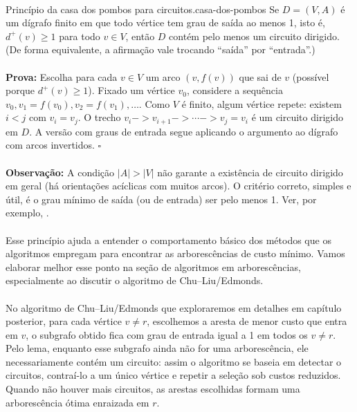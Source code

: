 \documentclass[12pt,a4paper]{article}
\def\emph#1{#1}%
\def\to{->}%
\begin{document}
\paragraph{}
\begin{lemabox}{Princípio da casa dos pombos para circuitos.}{casa-dos-pombos}
Se \(D=(V,A)\) é um dígrafo finito em que todo vértice tem grau de saída ao menos 1, isto é, \(d^+(v)\ge 1\) para todo \(v\in V\), então \(D\) contém pelo menos um circuito dirigido. (De forma equivalente, a afirmação vale trocando ``saída'' por ``entrada''.)

\paragraph{}
	\textbf{Prova:} Escolha para cada \(v\in V\) um arco \((v,f(v))\) que sai de \(v\) (possível porque \(d^+(v)\ge 1\)). Fixa\-do um vértice \(v_0\), considere a sequência \(v_0, v_1=f(v_0), v_2=f(v_1),\dots\). Como \(V\) é finito, algum vértice repete: existem \(i<j\) com \(v_i=v_j\). O trecho \(v_i\to v_{i+1}\to\cdots\to v_j=v_i\) é um circuito dirigido em \(D\). A versão com graus de entrada segue aplicando o argumento ao dígrafo com arcos invertidos. \hfill$\square$

\paragraph{}
\smallskip
	\textbf{Observação:} A condição \(|A|>|V|\) \emph{não} garante a existência de circuito dirigido em geral (há orientações acíclicas com muitos arcos). O critério correto, simples e útil, é o grau mínimo de saída (ou de entrada) ser pelo menos 1. Ver, por exemplo, \cite{schrijver2003comb}.

\end{lemabox}

\paragraph{}
Esse princípio ajuda a entender o comportamento básico dos métodos que os algoritmos empregam para encontrar as arborescências de custo mínimo. Vamos elaborar melhor esse ponto na seção de algoritmos em arborescências, especialmente ao discutir o algoritmo de Chu--Liu/Edmonds.

\paragraph{}
No algoritmo de Chu--Liu/Edmonds que exploraremos em detalhes em capítulo posterior, para cada vértice \(v\neq r\), escolhemos a aresta de menor custo que entra em \(v\), o subgrafo obtido fica com grau de entrada igual a 1 em todos os \(v\neq r\). Pelo lema, enquanto esse subgrafo ainda não for uma arborescência, ele necessariamente contém um circuito: assim o algoritmo se baseia em detectar o circuitos, contraí-lo a um único vértice e repetir a seleção sob custos reduzidos. Quando não houver mais circuitos, as arestas escolhidas formam uma arborescência ótima enraizada em \(r\).
\end{document}
